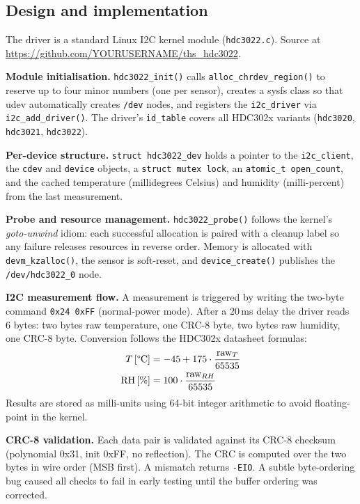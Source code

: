 \documentclass[10pt,a4]{article}
\begin{document}
\subsection{Design and implementation}

The driver is a standard Linux I2C kernel module (\texttt{hdc3022.c}).
Source at \url{https://github.com/YOURUSERNAME/ths_hdc3022}.

\textbf{Module initialisation.}
\texttt{hdc3022\_init()} calls \texttt{alloc\_chrdev\_region()} to reserve up to
four minor numbers (one per sensor), creates a sysfs class so that udev
automatically creates \texttt{/dev} nodes, and registers the \texttt{i2c\_driver}
via \texttt{i2c\_add\_driver()}. The driver's \texttt{id\_table} covers all
HDC302x variants (\texttt{hdc3020}, \texttt{hdc3021}, \texttt{hdc3022}).

\textbf{Per-device structure.}
\texttt{struct hdc3022\_dev} holds a pointer to the \texttt{i2c\_client}, the
\texttt{cdev} and \texttt{device} objects, a \texttt{struct mutex lock}, an
\texttt{atomic\_t open\_count}, and the cached temperature (millidegrees Celsius)
and humidity (milli-percent) from the last measurement.

\textbf{Probe and resource management.}
\texttt{hdc3022\_probe()} follows the kernel's \textit{goto-unwind} idiom: each
successful allocation is paired with a cleanup label so any failure releases
resources in reverse order. Memory is allocated with \texttt{devm\_kzalloc()},
the sensor is soft-reset, and \texttt{device\_create()} publishes the
\texttt{/dev/hdc3022\_0} node.

\textbf{I2C measurement flow.}
A measurement is triggered by writing the two-byte command \texttt{0x24 0xFF}
(normal-power mode). After a 20\,ms delay the driver reads 6 bytes:
two bytes raw temperature, one CRC-8 byte, two bytes raw humidity, one CRC-8 byte.
Conversion follows the HDC302x datasheet formulas:
\begin{align*}
T\,[\text{\textdegree{}C}] &= -45 + 175 \cdot \frac{\mathrm{raw}_T}{65535} \\
\mathrm{RH}\,[\%]           &= 100 \cdot \frac{\mathrm{raw}_{RH}}{65535}
\end{align*}
Results are stored as milli-units using 64-bit integer arithmetic to avoid
floating-point in the kernel.

\textbf{CRC-8 validation.}
Each data pair is validated against its CRC-8 checksum (polynomial 0x31, init
0xFF, no reflection). The CRC is computed over the two bytes in wire order (MSB
first). A mismatch returns \texttt{-EIO}. A subtle byte-ordering bug caused all
checks to fail in early testing until the buffer ordering was corrected.
\end{document}
